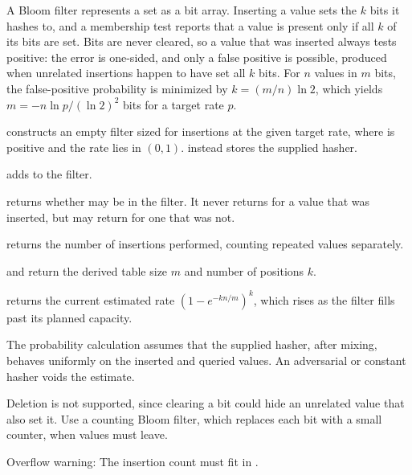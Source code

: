 A Bloom filter represents a set as a bit array. Inserting a value sets the $k$ bits it hashes to, and a membership test reports that a value is present only if all $k$ of its bits are set. Bits are never cleared, so a value that was inserted always tests positive: the error is one-sided, and only a false positive is possible, produced when unrelated insertions happen to have set all $k$ bits. For $n$ values in $m$ bits, the false-positive probability is minimized by $k = (m/n) \ln 2$, which yields $m = -n \ln p / (\ln 2)^2$ bits for a target rate $p$.

\begin{compactitem}
  \item {} constructs an empty filter sized for  insertions at the given target rate, where  is positive and the rate lies in $(0, 1)$.  instead stores the supplied hasher.
  \item {} adds  to the filter.
  \item {} returns whether  may be in the filter. It never returns  for a value that was inserted, but may return  for one that was not.
  \item {} returns the number of insertions performed, counting repeated values separately.
  \item {} and  return the derived table size $m$ and number of positions $k$.
  \item {} returns the current estimated rate $(1 - e^{-kn/m})^k$, which rises as the filter fills past its planned capacity.
\end{compactitem}

The probability calculation assumes that the supplied hasher, after mixing, behaves uniformly on the inserted and queried values. An adversarial or constant hasher voids the estimate.

Deletion is not supported, since clearing a bit could hide an unrelated value that also set it. Use a counting Bloom filter, which replaces each bit with a small counter, when values must leave.

Overflow warning: The insertion count must fit in .

